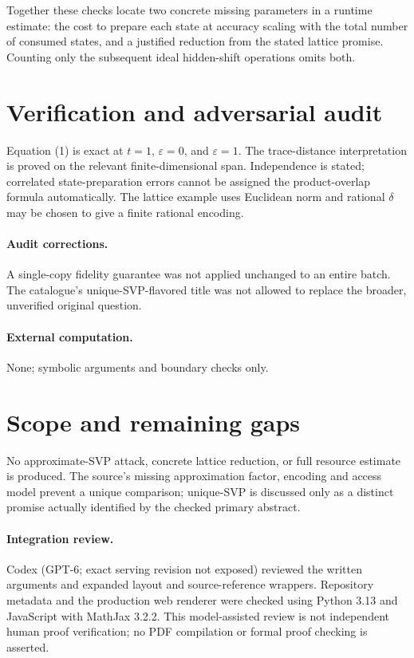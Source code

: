 \documentclass[11pt]{article}
\begin{document}
Together these checks locate two concrete missing parameters in a runtime estimate: the cost to prepare each state at accuracy scaling with the total number of consumed states, and a justified reduction from the stated lattice promise. Counting only the subsequent ideal hidden-shift operations omits both.
\section{Verification and adversarial audit}
Equation (1) is exact at $t=1$, $\varepsilon=0$, and $\varepsilon=1$. The trace-distance interpretation is proved on the relevant finite-dimensional span. Independence is stated; correlated state-preparation errors cannot be assigned the product-overlap formula automatically. The lattice example uses Euclidean norm and rational $\delta$ may be chosen to give a finite rational encoding.
\paragraph{Audit corrections.} A single-copy fidelity guarantee was not applied unchanged to an entire batch. The catalogue's unique-SVP-flavored title was not allowed to replace the broader, unverified original question.
\paragraph{External computation.} None; symbolic arguments and boundary checks only.
\section{Scope and remaining gaps}
No approximate-SVP attack, concrete lattice reduction, or full resource estimate is produced. The source's missing approximation factor, encoding and access model prevent a unique comparison; unique-SVP is discussed only as a distinct promise actually identified by the checked primary abstract.
\paragraph{Integration review.} Codex (GPT-6; exact serving revision not exposed) reviewed the written arguments and expanded layout and source-reference wrappers. Repository metadata and the production web renderer were checked using Python 3.13 and JavaScript with MathJax 3.2.2. This model-assisted review is not independent human proof verification; no PDF compilation or formal proof checking is asserted.
\end{document}
